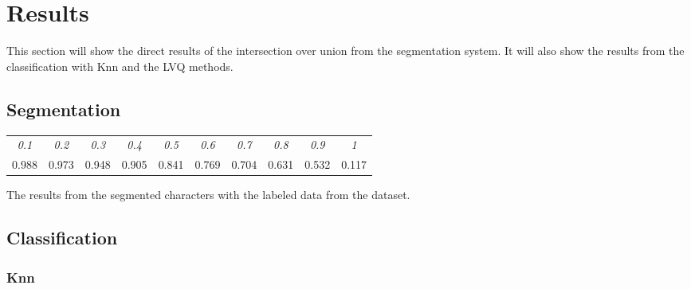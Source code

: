 \newpage
\section{Results} %
\label{sec:results}

This section will show the direct results of the intersection over union from the segmentation system. It will also show the results from the classification with Knn and the LVQ methods.

\subsection{Segmentation}

\begin{minipage}{\linewidth}
\centering
{} \label{tab:results:iou} 
\begin{tabular}{ c c c c c c c c c c}
\hline
\hline
\textit{0.1} & \textit{0.2} & \textit{0.3} & \textit{0.4} & \textit{0.5} & \textit{0.6} & \textit{0.7} & \textit{0.8} & \textit{0.9} & \textit{1}\\
0.988	&	0.973	&	0.948	&	0.905	&	0.841	&	0.769	&	0.704	&	0.631	&	0.532	&	0.117	\\
\hline
\end{tabular}\par
\flushleft
The results from the segmented characters with the labeled data from the dataset.
\bigskip
\bigskip
\end{minipage}

\subsection{Classification}

\subsubsection{Knn}

